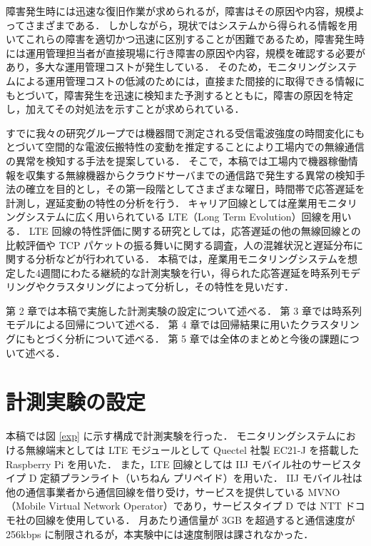 \documentclass[technicalreport]{ieicej}
\begin{document}
障害発生時には迅速な復旧作業が求められるが，障害はその原因や内容，規模よってさまざまである．
しかしながら，現状ではシステムから得られる情報を用いてこれらの障害を適切かつ迅速に区別することが困難であるため，障害発生時には運用管理担当者が直接現場に行き障害の原因や内容，規模を確認する必要があり，多大な運用管理コストが発生している．
そのため，モニタリングシステムによる運用管理コストの低減のためには，直接また間接的に取得できる情報にもとづいて，障害発生を迅速に検知また予測するとともに，障害の原因を特定し，加えてその対処法を示すことが求められている．

すでに我々の研究グループでは機器間で測定される受信電波強度の時間変化にもとづいて空間的な電波伝搬特性の変動を推定することにより工場内での無線通信の異常を検知する手法を提案している\cite{prev}．
そこで，本稿では工場内で機器稼働情報を収集する無線機器からクラウドサーバまでの通信路で発生する異常の検知手法の確立を目的とし，その第一段階としてさまざまな曜日，時間帯で応答遅延を計測し，遅延変動の特性の分析を行う．
キャリア回線としては産業用モニタリングシステムに広く用いられている LTE（Long Term Evolution）回線を用いる．
LTE 回線の特性評価に関する研究としては，応答遅延の他の無線回線との比較評価\cite{lte1}\cite{lte2}や TCP パケットの振る舞いに関する調査\cite{tcp}，人の混雑状況と遅延分布に関する分析\cite{distribution}などが行われている．
本稿では，産業用モニタリングシステムを想定した4週間にわたる継続的な計測実験を行い，得られた応答遅延を時系列モデリングやクラスタリングによって分析し，その特性を見いだす．

第 2 章では本稿で実施した計測実験の設定について述べる．
第 3 章では時系列モデルによる回帰について述べる．
第 4 章では回帰結果に用いたクラスタリングにもとづく分析について述べる．
第 5 章では全体のまとめと今後の課題について述べる．
\section{計測実験の設定}
本稿では図 \ref{exp} に示す構成で計測実験を行った．
モニタリングシステムにおける無線端末としては LTE モジュールとして Quectel 社製 EC21-J を搭載した Raspberry Pi を用いた．
また，LTE 回線としては IIJ モバイル社のサービスタイプ D 定額プランライト（いちねん プリペイド）を用いた．
IIJ モバイル社は他の通信事業者から通信回線を借り受け，サービスを提供している MVNO（Mobile Virtual Network Operator）であり，サービスタイプ D では NTT ドコモ社の回線を使用している．
月あたり通信量が 3GB を超過すると通信速度が 256kbps に制限されるが，本実験中には速度制限は課されなかった．
\end{document}
